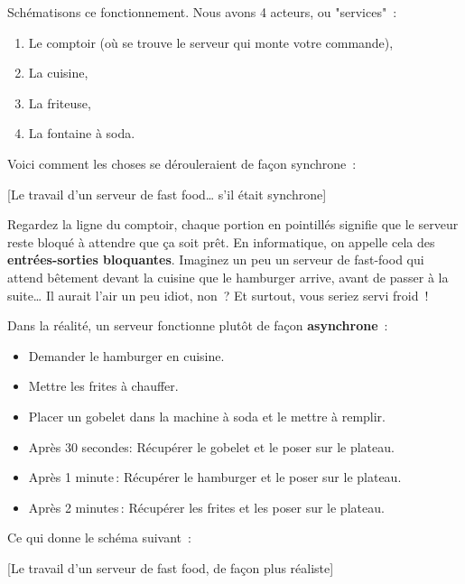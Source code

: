 \documentclass[small]{zmdocument}
\begin{document}
Schématisons ce fonctionnement. Nous avons 4 acteurs, ou "services" :



\begin{enumerate}
\item\relax Le comptoir (où se trouve le serveur qui monte votre commande),
\item\relax La cuisine,
\item\relax La friteuse,
\item\relax La fontaine à soda.
\end{enumerate}


Voici comment les choses se dérouleraient de façon synchrone :




{\centering {}[Le travail d’un serveur de fast food… s’il était synchrone]
}


Regardez la ligne du comptoir, chaque portion en pointillés signifie que le serveur reste bloqué à attendre que ça soit prêt. En informatique, on appelle cela des \textbf{entrées-sorties bloquantes}. Imaginez un peu un serveur de fast-food qui attend bêtement devant la cuisine que le hamburger arrive, avant de passer à la suite… Il aurait l’air un peu idiot, non ? Et surtout, vous seriez servi froid !



Dans la réalité, un serveur fonctionne plutôt de façon \textbf{asynchrone} :



\begin{itemize}
\item\relax Demander le hamburger en cuisine.
\item\relax Mettre les frites à chauffer.
\item\relax Placer un gobelet dans la machine à soda et le mettre à remplir.
\item\relax Après 30 secondes: Récupérer le gobelet et le poser sur le plateau.
\item\relax Après 1 minute : Récupérer le hamburger et le poser sur le plateau.
\item\relax Après 2 minutes : Récupérer les frites et les poser sur le plateau.
\end{itemize}


Ce qui donne le schéma suivant :




{\centering {}[Le travail d’un serveur de fast food, de façon plus réaliste]
}
\end{document}
